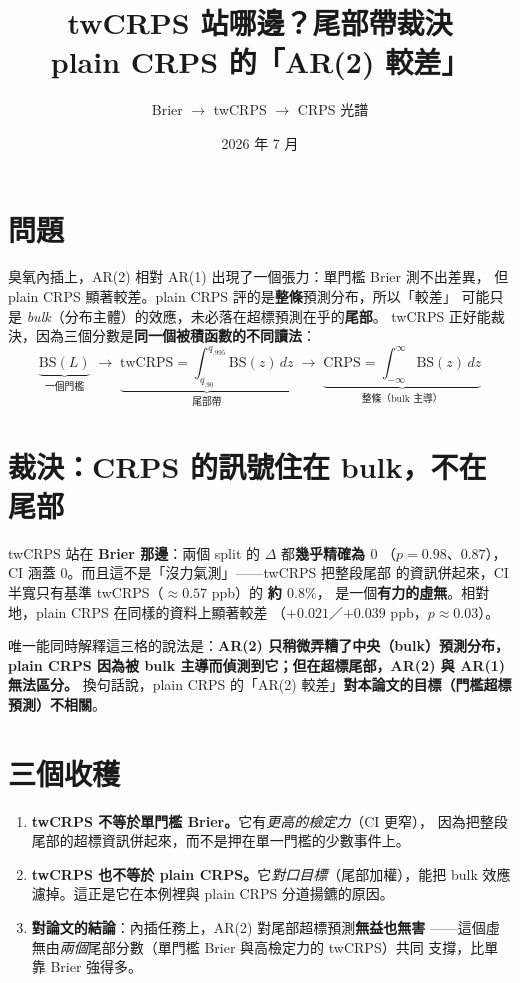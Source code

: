 \documentclass[12pt]{article}
\title{\textbf{twCRPS 站哪邊？尾部帶裁決\\plain CRPS 的「AR(2) 較差」}}
\author{Brier $\to$ twCRPS $\to$ CRPS 光譜}
\date{2026 年 7 月}
\begin{document}
\maketitle

\section*{問題}

臭氧內插上，AR(2) 相對 AR(1) 出現了一個張力：單門檻 Brier 測不出差異，
但 plain CRPS 顯著較差。plain CRPS 評的是\textbf{整條}預測分布，所以「較差」
可能只是 \emph{bulk}（分布主體）的效應，未必落在超標預測在乎的\textbf{尾部}。
twCRPS 正好能裁決，因為三個分數是\textbf{同一個被積函數的不同讀法}：
\[
  \underbrace{\mathrm{BS}(L)}_{\text{一個門檻}}\;\to\;
  \underbrace{\mathrm{twCRPS}=\!\int_{q_{.90}}^{q_{.995}}\!\mathrm{BS}(z)\,dz}_{\text{尾部帶}}\;\to\;
  \underbrace{\mathrm{CRPS}=\!\int_{-\infty}^{\infty}\!\mathrm{BS}(z)\,dz}_{\text{整條（bulk 主導）}}
\]

\bigskip


\section*{裁決：CRPS 的訊號住在 bulk，不在尾部}

twCRPS 站在 \textbf{Brier 那邊}：兩個 split 的 $\Delta$ 都\textbf{幾乎精確為 $0$}
（$p=0.98$、$0.87$），CI 涵蓋 $0$。而且這不是「沒力氣測」——twCRPS 把整段尾部
的資訊併起來，CI 半寬只有基準 twCRPS（$\approx 0.57$ ppb）的 \textbf{約 $0.8\%$}，
是一個\textbf{有力的虛無}。相對地，plain CRPS 在同樣的資料上顯著較差
（$+0.021$／$+0.039$ ppb，$p\approx0.03$）。

唯一能同時解釋這三格的說法是：\textbf{AR(2) 只稍微弄糟了中央（bulk）預測分布，
plain CRPS 因為被 bulk 主導而偵測到它；但在超標尾部，AR(2) 與 AR(1) 無法區分。}
換句話說，plain CRPS 的「AR(2) 較差」\textbf{對本論文的目標（門檻超標預測）不相關}。

\section*{三個收穫}

\begin{enumerate}
  \item \textbf{twCRPS 不等於單門檻 Brier。}它有\emph{更高的檢定力}（CI 更窄），
        因為把整段尾部的超標資訊併起來，而不是押在單一門檻的少數事件上。
  \item \textbf{twCRPS 也不等於 plain CRPS。}它\emph{對口目標}（尾部加權），能把
        bulk 效應濾掉。這正是它在本例裡與 plain CRPS 分道揚鑣的原因。
  \item \textbf{對論文的結論}：內插任務上，AR(2) 對尾部超標預測\textbf{無益也無害}
        ——這個虛無由\emph{兩個}尾部分數（單門檻 Brier 與高檢定力的 twCRPS）共同
        支撐，比單靠 Brier 強得多。
\end{enumerate}
\end{document}
